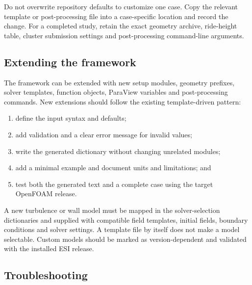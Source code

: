 Do not overwrite repository defaults to customize one case. Copy the relevant template or post-processing file into a case-specific location and record the change. For a completed study, retain the exact geometry archive, ride-height table, cluster submission settings and post-processing command-line arguments.

\subsection{Extending the framework}

The framework can be extended with new setup modules, geometry prefixes, solver templates, function objects, ParaView variables and post-processing commands. New extensions should follow the existing template-driven pattern:
\begin{enumerate}
    \item define the input syntax and defaults;
    \item add validation and a clear error message for invalid values;
    \item write the generated dictionary without changing unrelated modules;
    \item add a minimal example and document units and limitations; and
    \item test both the generated text and a complete case using the target OpenFOAM release.
\end{enumerate}

A new turbulence or wall model must be mapped in the solver-selection dictionaries and supplied with compatible field templates, initial fields, boundary conditions and solver settings. A template file by itself does not make a model selectable. Custom models should be marked as version-dependent and validated with the installed ESI release.

\subsection{Troubleshooting}

